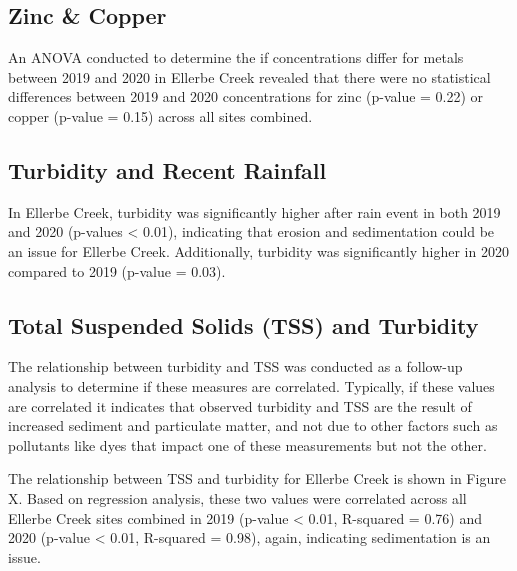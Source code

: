 \documentclass[
  12pt,
]{article}
\begin{document}
\hypertarget{zinc-copper}{%
\subsection{Zinc \& Copper}\label{zinc-copper}}

An ANOVA conducted to determine the if concentrations differ for metals
between 2019 and 2020 in Ellerbe Creek revealed that there were no
statistical differences between 2019 and 2020 concentrations for zinc
(p-value = 0.22) or copper (p-value = 0.15) across all sites combined.

\hypertarget{turbidity-and-recent-rainfall}{%
\subsection{Turbidity and Recent
Rainfall}\label{turbidity-and-recent-rainfall}}

In Ellerbe Creek, turbidity was significantly higher after rain event in
both 2019 and 2020 (p-values \textless{} 0.01), indicating that erosion
and sedimentation could be an issue for Ellerbe Creek. Additionally,
turbidity was significantly higher in 2020 compared to 2019 (p-value =
0.03).

\hypertarget{total-suspended-solids-tss-and-turbidity}{%
\subsection{Total Suspended Solids (TSS) and
Turbidity}\label{total-suspended-solids-tss-and-turbidity}}

The relationship between turbidity and TSS was conducted as a follow-up
analysis to determine if these measures are correlated. Typically, if
these values are correlated it indicates that observed turbidity and TSS
are the result of increased sediment and particulate matter, and not due
to other factors such as pollutants like dyes that impact one of these
measurements but not the other.

The relationship between TSS and turbidity for Ellerbe Creek is shown in
Figure X. Based on regression analysis, these two values were correlated
across all Ellerbe Creek sites combined in 2019 (p-value \textless{}
0.01, R-squared = 0.76) and 2020 (p-value \textless{} 0.01, R-squared =
0.98), again, indicating sedimentation is an issue.
\end{document}
